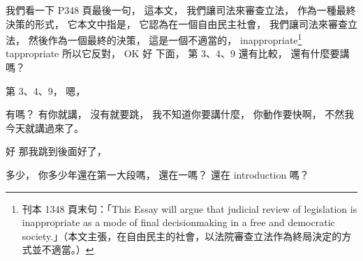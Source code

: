 \hypertarget{w06:cue:150}{}我們看一下 P348 頁最後一句，
\hypertarget{w06:cue:151}{}這本文，
\hypertarget{w06:cue:152}{}我們讓司法來審查立法，
\hypertarget{w06:cue:153}{}作為一種最終決策的形式，
\hypertarget{w06:cue:154}{}它本文中指是，
\hypertarget{w06:cue:155}{}它認為在一個自由民主社會，
\hypertarget{w06:cue:156}{}我們讓司法來審查立法，
\hypertarget{w06:cue:157}{}然後作為一個最終的決策，
\hypertarget{w06:cue:158}{}這是一個不適當的，
\hypertarget{w06:cue:159}{}inappropriate\footnote{刊本 1348 頁末句：「This Essay will argue that judicial review of legislation is inappropriate as a mode of final decisionmaking in a free and democratic society.」（本文主張，在自由民主的社會，以法院審查立法作為終局決定的方式並不適當。）}
\hypertarget{w06:cue:160}{}tappropriate
\hypertarget{w06:cue:161}{}所以它反對，
\hypertarget{w06:cue:162}{}OK
\hypertarget{w06:cue:163}{}好 下面，
\hypertarget{w06:cue:164}{}第 3、4、9 還有比較，
\hypertarget{w06:cue:165}{}還有什麼要講嗎？

\hypertarget{w06:cue:166}{}第 3、4、9，
\hypertarget{w06:cue:167}{}嗯，

\hypertarget{w06:cue:168}{}有嗎？
\hypertarget{w06:cue:169}{}有你就講，
\hypertarget{w06:cue:170}{}沒有就要跳，
\hypertarget{w06:cue:171}{}我不知道你要講什麼，
\hypertarget{w06:cue:172}{}你動作要快啊，
\hypertarget{w06:cue:173}{}不然我今天就講過來了。

\hypertarget{w06:cue:174}{}好 那我跳到後面好了，

\hypertarget{w06:cue:175}{}多少，
\hypertarget{w06:cue:176}{}你多少年還在第一大段嗎，
\hypertarget{w06:cue:177}{}還在一嗎？
\hypertarget{w06:cue:178}{}還在 introduction 嗎？

